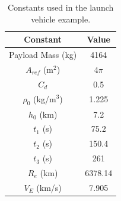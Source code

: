 \documentclass[10pt,final]{report}
\newcounter{example}[chapter]
\begin{document}

\begin{table}[h]
\caption{Constants used in the launch vehicle example.}
\begin{center}
\begin{tabular}{|c|c|}
\hline
Constant & Value \\
\hline \hline
Payload Mass (kg) & 4164 \\
\hline
$A_{ref}$ (m${}^2$) & $4\pi$ \\
\hline
$C_d$ & 0.5 \\
\hline
$\rho_0$ (kg/m${}^3$)& 1.225 \\
\hline
$h_0$ (km) & 7.2\\
\hline
$t_1$ (s) & 75.2 \\
\hline
 $t_2$ (s) & 150.4 \\
\hline
 $t_3$ (s) & 261 \\
\hline
 $R_e$ (km) & 6378.14 \\
\hline
 $V_E$ (km/s) & 7.905\\
\hline
\end{tabular}
\end{center}
\label{dynamics properties}
\end{table}
\end{document}
